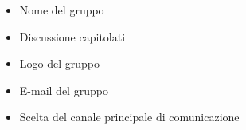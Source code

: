 \begin{itemize}
	\item Nome del gruppo
	\item Discussione capitolati
	\item Logo del gruppo
	\item E-mail del gruppo
	\item Scelta del canale principale di comunicazione
	
\end{itemize}